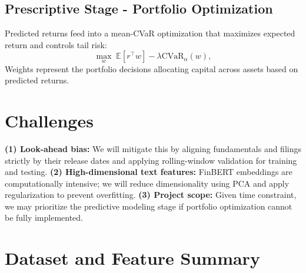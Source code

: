 \documentclass[11pt]{article}
\begin{document}
\subsection*{Prescriptive Stage - Portfolio Optimization}
Predicted returns feed into a mean-CVaR optimization that maximizes expected return and controls tail risk:
\[
\max_{w}\; \mathbb{E}[r^{\top}w] - \lambda \text{CVaR}_{\alpha}(w),
\]
Weights represent the portfolio decisions allocating capital across assets based on predicted returns.



\section{Challenges}
\textbf{(1) Look-ahead bias:} We will mitigate this by aligning fundamentals and filings strictly by their release dates and applying rolling-window validation for training and testing.  
\textbf{(2) High-dimensional text features:} FinBERT embeddings are computationally intensive; we will reduce dimensionality using PCA and apply regularization to prevent overfitting.  
\textbf{(3) Project scope:} Given time constraint, we may prioritize the predictive modeling stage if portfolio optimization cannot be fully implemented.

\newpage
\appendix

\section{Dataset and Feature Summary}
\end{document}
